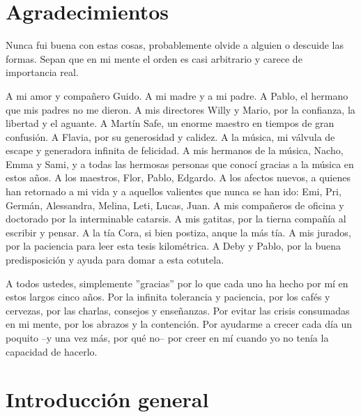 \documentclass[12pt]{book}
\theoremstyle{plain}
\theoremstyle{remark}
\begin{document}


%

\chapter*{Agradecimientos}


Nunca fui buena con estas cosas, probablemente olvide a alguien o descuide las formas. Sepan que en mi mente el orden es casi arbitrario y carece de importancia real.

A mi amor y compañero Guido. A mi madre y a mi padre. A Pablo, el hermano que mis padres no me dieron. 
A mis directores Willy y Mario, por la confianza, la libertad y el aguante. A Martín Safe, un enorme maestro en tiempos de gran confusión. A Flavia, por su generosidad y calidez.
A la música, mi válvula de escape y generadora infinita de felicidad. A mis hermanos de la música, Nacho, Emma y Sami, y a todas las hermosas personas que conocí gracias a la música en estos años. A los maestros, Flor, Pablo, Edgardo.
A los afectos nuevos, a quienes han retornado a mi vida y a aquellos valientes que nunca se han ido: Emi, Pri, Germán, Alessandra, Melina, Leti, Lucas, Juan. A mis compañeros de oficina y doctorado por la interminable catarsis. A mis gatitas, por la tierna compañía al escribir y pensar. A la tía Cora, si bien postiza, anque la más tía. A mis jurados, por la paciencia para leer esta tesis kilométrica. A Deby y Pablo, por la buena predisposición y ayuda para domar a esta cotutela.

A todos ustedes, simplemente ''gracias'' por lo que cada uno ha hecho por mí en estos largos cinco años. Por la infinita tolerancia y paciencia, por los cafés y cervezas, por las charlas, consejos y enseñanzas. Por evitar las crisis consumadas en mi mente, por los abrazos y la contención. Por ayudarme a crecer cada día un poquito --y una vez más, por qué no-- por creer en mí cuando yo no tenía la capacidad de hacerlo.



%
\tableofcontents




%
\chapter*{Introducción general}
\end{document}
